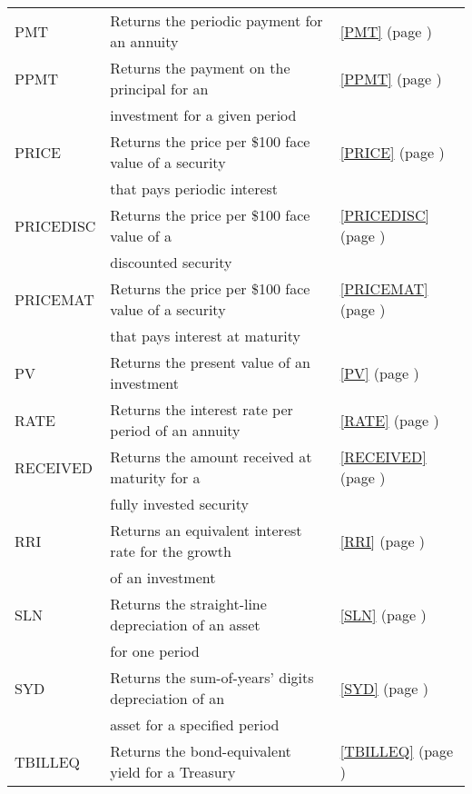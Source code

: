 \begin{center}
\begin{longtable}{l l l }
		PMT   & Returns the periodic payment for an annuity &  \ref{PMT} (page \pageref{PMT}) \index{Spreadsheet Functions!PMT} \\
		PPMT  & Returns the payment on the principal for an &  \ref{PPMT} (page \pageref{PPMT}) \index{Spreadsheet Functions!PPMT} \\
		& investment for a given period &   \\
		PRICE & Returns the price per \$100 face value of a security &  \ref{PRICE} (page \pageref{PRICE}) \index{Spreadsheet Functions!PRICE} \\
		& that pays periodic interest &   \\
		PRICEDISC & Returns the price per \$100 face value of a &  \ref{PRICEDISC} (page \pageref{PRICEDISC}) \index{Spreadsheet Functions!PRICEDISC} \\
		& discounted security &   \\
		PRICEMAT & Returns the price per \$100 face value of a security &  \ref{PRICEMAT} (page \pageref{PRICEMAT}) \index{Spreadsheet Functions!PRICEMAT} \\
		& that pays interest at maturity &   \\
		PV    & Returns the present value of an investment &  \ref{PV} (page \pageref{PV}) \index{Spreadsheet Functions!PV} \\
		RATE  & Returns the interest rate per period of an annuity &  \ref{RATE} (page \pageref{RATE}) \index{Spreadsheet Functions!RATE} \\
		RECEIVED & Returns the amount received at maturity for a &  \ref{RECEIVED} (page \pageref{RECEIVED}) \index{Spreadsheet Functions!RECEIVED} \\
		& fully invested security &   \\
		RRI  & Returns an equivalent interest rate for the growth &  \ref{RRI} (page \pageref{RRI}) \index{Spreadsheet Functions!RRI} \\
		& of an investment  &   \\		
		SLN   & Returns the straight-line depreciation of an asset &  \ref{SLN} (page \pageref{SLN}) \index{Spreadsheet Functions!SLN} \\
		& for one period &   \\
		SYD   & Returns the sum-of-years' digits depreciation of an &  \ref{SYD} (page \pageref{SYD}) \index{Spreadsheet Functions!SYD} \\
		& asset for a specified period &   \\
		TBILLEQ & Returns the bond-equivalent yield for a Treasury &  \ref{TBILLEQ} (page \pageref{TBILLEQ}) \index{Spreadsheet Functions!TBILLEQ} \\

\end{longtable}
\end{center}
